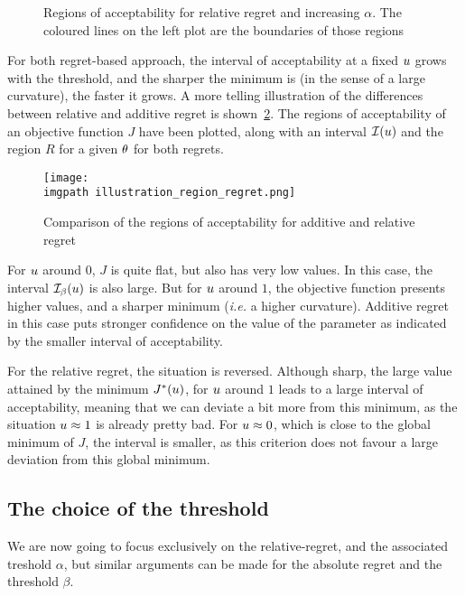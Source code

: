 \documentclass[../../Main_ManuscritThese.tex]{subfiles}
\newcommand\imgpath{/home/victor/acadwriting/Manuscrit/Text/Chapter3/img/}
\begin{document}
\begin{figure}[ht]
  \centering
  
  \caption[Regions of
  $\alpha$-acceptability]{\label{fig:gamma_alpha_increasing} Regions
    of acceptability for relative regret and increasing $\alpha$. The
    coloured lines on the left plot are the boundaries of those
    regions}
\end{figure}

For both regret-based approach, the interval of acceptability at a
fixed $u$ grows with the threshold, and the sharper the minimum is
(in the sense of a large curvature), the faster it grows.  A more
telling illustration of the differences between relative and additive
regret is shown~\cref{fig:illustration_region_regret}.  The regions of
acceptability of an objective function $J$ have been plotted, along
with an interval $\mathcal{I}(u)$ and the region $R$ for a given
$\theta$ for both regrets.
\begin{figure}[ht]
  \centering
  \texttt{[image: \\imgpath illustration\_region\_regret.png]}
  \caption{\label{fig:illustration_region_regret} Comparison of the regions of acceptability for additive and relative regret}
\end{figure}
For $u$ around $0$, $J$ is quite flat, but also has very low
values. In this case, the interval $\mathcal{I}_{\beta}(u)$ is also
large. But for $u$ around $1$, the objective function presents
higher values, and a sharper minimum (\emph{i.e.} a higher
curvature). Additive regret in this case puts stronger confidence on
the value of the parameter as indicated by the smaller interval of
acceptability.

For the relative regret, the situation is reversed. Although sharp,
the large value attained by the minimum $J^*(u)$, for $u$ around
$1$ leads to a large interval of acceptability, meaning that we can
deviate a bit more from this minimum, as the situation $u \approx 1$
is already pretty bad. For $u \approx 0$, which is close to the
global minimum of $J$, the interval is smaller, as this criterion does
not favour a large deviation from this global minimum.



\subsection{The choice of the threshold}
\label{sec:choice_threshold}
We are now going to focus exclusively on the relative-regret, and the
associated treshold $\alpha$, but similar arguments can be made for
the absolute regret and the threshold $\beta$.
\end{document}
